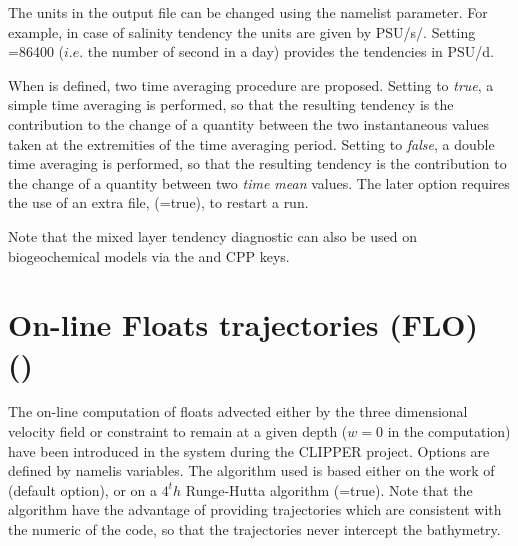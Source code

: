 The units in the output file can be changed using the  namelist parameter. 
For example, in case of salinity tendency the units are given by PSU/s/.
Setting =86400 ($i.e.$ the number of second in a day) provides the tendencies in PSU/d.

When  is defined, two time averaging procedure are proposed.
Setting  to \textit{true}, a simple time averaging is performed, 
so that the resulting tendency is the contribution to the change of a quantity between 
the two instantaneous values taken at the extremities of the time averaging period.
Setting  to \textit{false}, a double time averaging is performed, 
so that the resulting tendency is the contribution to the change of a quantity between 
two \textit{time mean} values. The later option requires the use of an extra file,   
(=true), to restart a run.


Note that the mixed layer tendency diagnostic can also be used on biogeochemical models 
via the  and  CPP keys.

\section{On-line Floats trajectories (FLO) ()}
\label{FLO}

The on-line computation of floats advected either by the three dimensional velocity 
field or constraint to remain at a given depth ($w = 0$ in the computation) have been 
introduced in the system during the CLIPPER project. Options are defined by 
namelis variables. The algorithm used is based 
either on the work of \cite{Blanke_Raynaud_JPO97} (default option), or on a $4^th$
Runge-Hutta algorithm (=true). Note that the \cite{Blanke_Raynaud_JPO97} 
algorithm have the advantage of providing trajectories which are consistent with the 
numeric of the code, so that the trajectories never intercept the bathymetry. 

